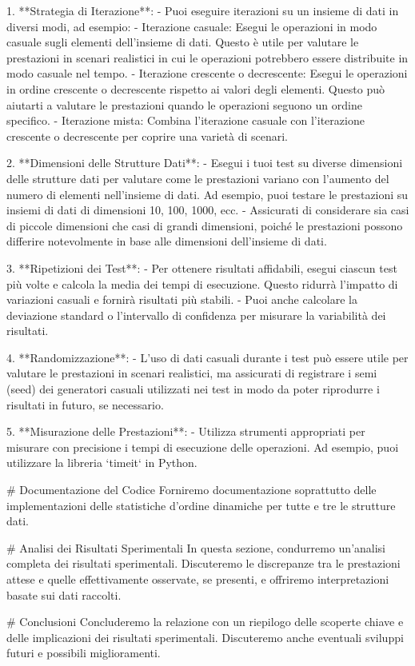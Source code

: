 \documentclass[twocolumn]{article}
\begin{document}
\begin{markdown}
1. **Strategia di Iterazione**:
   - Puoi eseguire iterazioni su un insieme di dati in diversi modi, ad esempio:
     - Iterazione casuale: Esegui le operazioni in modo casuale sugli elementi dell'insieme di dati. Questo è utile per valutare le prestazioni in scenari realistici in cui le operazioni potrebbero essere distribuite in modo casuale nel tempo.
     - Iterazione crescente o decrescente: Esegui le operazioni in ordine crescente o decrescente rispetto ai valori degli elementi. Questo può aiutarti a valutare le prestazioni quando le operazioni seguono un ordine specifico.
     - Iterazione mista: Combina l'iterazione casuale con l'iterazione crescente o decrescente per coprire una varietà di scenari.

2. **Dimensioni delle Strutture Dati**:
   - Esegui i tuoi test su diverse dimensioni delle strutture dati per valutare come le prestazioni variano con l'aumento del numero di elementi nell'insieme di dati. Ad esempio, puoi testare le prestazioni su insiemi di dati di dimensioni 10, 100, 1000, ecc.
   - Assicurati di considerare sia casi di piccole dimensioni che casi di grandi dimensioni, poiché le prestazioni possono differire notevolmente in base alle dimensioni dell'insieme di dati.

3. **Ripetizioni dei Test**:
   - Per ottenere risultati affidabili, esegui ciascun test più volte e calcola la media dei tempi di esecuzione. Questo ridurrà l'impatto di variazioni casuali e fornirà risultati più stabili.
   - Puoi anche calcolare la deviazione standard o l'intervallo di confidenza per misurare la variabilità dei risultati.

4. **Randomizzazione**:
   - L'uso di dati casuali durante i test può essere utile per valutare le prestazioni in scenari realistici, ma assicurati di registrare i semi (seed) dei generatori casuali utilizzati nei test in modo da poter riprodurre i risultati in futuro, se necessario.

5. **Misurazione delle Prestazioni**:
   - Utilizza strumenti appropriati per misurare con precisione i tempi di esecuzione delle operazioni. Ad esempio, puoi utilizzare la libreria `timeit` in Python.

# Documentazione del Codice
Forniremo documentazione soprattutto delle implementazioni delle statistiche d'ordine dinamiche per tutte e tre le strutture dati.

# Analisi dei Risultati Sperimentali
In questa sezione, condurremo un'analisi completa dei risultati sperimentali. Discuteremo le discrepanze tra le prestazioni attese e quelle effettivamente osservate, se presenti, e offriremo interpretazioni basate sui dati raccolti.

# Conclusioni
Concluderemo la relazione con un riepilogo delle scoperte chiave e delle implicazioni dei risultati sperimentali. Discuteremo anche eventuali sviluppi futuri e possibili miglioramenti.
\end{markdown}

\newpage




\end{document}

